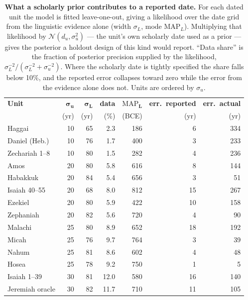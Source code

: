 \documentclass[10pt,letterpaper]{article}
\begin{document}
\begin{table}[!ht]
\centering
\caption{\textbf{What a scholarly prior contributes to a reported date.}
For each dated unit the model is fitted leave-one-out, giving a likelihood
over the date grid from the linguistic evidence alone (width
$\sigma_L$, mode $\mathrm{MAP}_L$).  Multiplying that likelihood by
$\mathcal{N}(d_u, \sigma_u^2)$ --- the unit's own scholarly date used as a
prior --- gives the posterior a holdout design of this kind would report.
``Data share'' is the fraction of posterior precision supplied by the
likelihood, $\sigma_L^{-2}/(\sigma_L^{-2}+\sigma_u^{-2})$.  Where the
scholarly date is tightly specified the share falls below 10\%, and the
reported error collapses toward zero while the error from the evidence
alone does not.  Units are ordered by $\sigma_u$.}
\begin{tabular}{lrrrrrr}
\hline
\textbf{Unit} & $\mathbf{\sigma_u}$ & $\mathbf{\sigma_L}$ & \textbf{data} & $\mathbf{\mathrm{MAP}_L}$ & \textbf{err.\ reported} & \textbf{err.\ actual} \\
 & (yr) & (yr) & (\%) & (BCE) & (yr) & (yr) \\
\hline
Haggai            & 10 & 65 & 2.3 & 186 & 6 & 334 \\
Daniel (Heb.)     & 10 & 76 & 1.7 & 400 & 3 & 233 \\
Zechariah 1--8    & 10 & 80 & 1.5 & 282 & 4 & 236 \\
Amos              & 20 & 80 & 5.8 & 616 & 8 & 144 \\
Habakkuk          & 20 & 84 & 5.4 & 656 & 3 & 51 \\
Isaiah 40--55     & 20 & 68 & 8.0 & 812 & 15 & 267 \\
Ezekiel           & 20 & 80 & 5.9 & 422 & 10 & 158 \\
Zephaniah         & 20 & 82 & 5.6 & 720 & 4 & 90 \\
Malachi           & 25 & 80 & 8.9 & 652 & 18 & 192 \\
Micah             & 25 & 76 & 9.7 & 764 & 3 & 39 \\
Nahum             & 25 & 81 & 8.6 & 602 & 4 & 48 \\
Hosea             & 25 & 78 & 9.2 & 750 & 1 & 5 \\
Isaiah 1--39      & 30 & 81 & 12.0 & 580 & 16 & 140 \\
Jeremiah oracle   & 30 & 82 & 11.7 & 710 & 11 & 105 \\
\hline
\end{tabular}
\label{tab:leakage}
\end{table}
\end{document}
